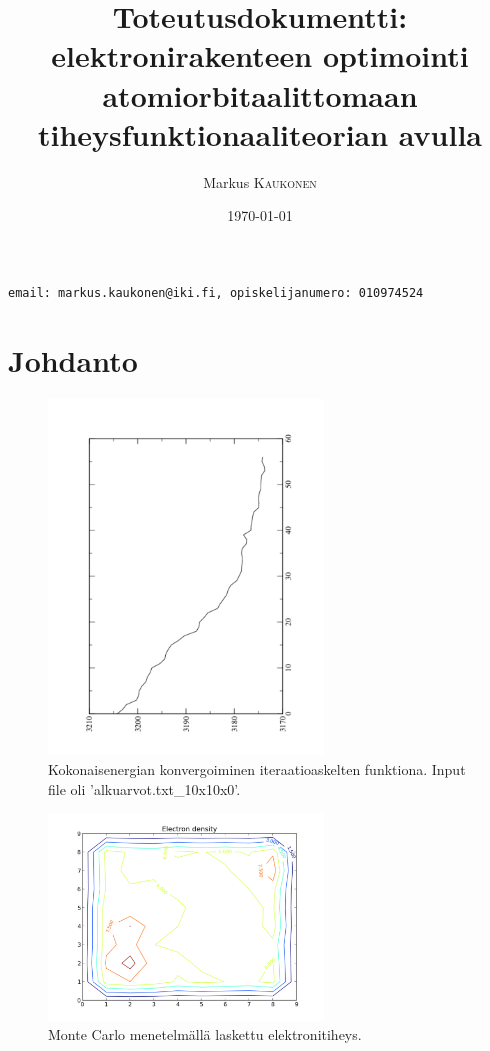 \documentclass{article}
\title{Toteutusdokumentti: elektronirakenteen optimointi atomiorbitaalittomaan tiheysfunktionaaliteorian avulla} %
\author{Markus \textsc{Kaukonen} %
}
\date{\today} %
\begin{document}
\maketitle %
\hspace{1cm} \texttt{email: markus.kaukonen@iki.fi, opiskelijanumero: 010974524}

\newpage



\section{Johdanto}

\begin{figure}[h]
\begin{center}
\includegraphics[width=0.65\textwidth]{10x10x0energiat.pdf} %
\caption{Kokonaisenergian konvergoiminen iteraatioaskelten funktiona. Input file oli 'alkuarvot.txt\_10x10x0'.}
\end{center}
\end{figure}

\begin{figure}[h]
\begin{center}
\includegraphics[width=0.65\textwidth]{final_10x10x0.pdf} %
\caption{Monte Carlo menetelmällä laskettu elektronitiheys.}
\end{center}
\end{figure}
\end{document}
